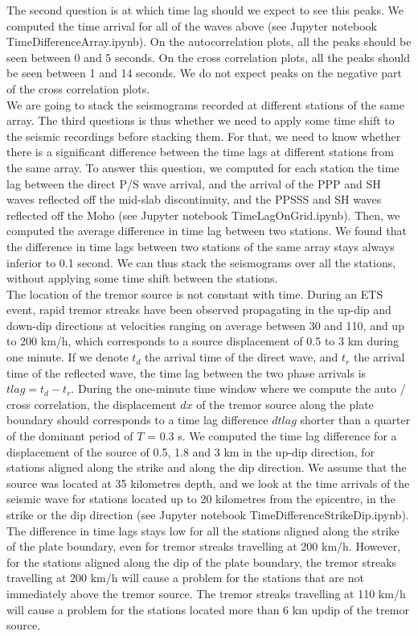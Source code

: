 \documentclass[workdone.tex]{subfiles}
\begin{document}
The second question is at which time lag should we expect to see this peaks. We computed the time arrival for all of the waves above (see Jupyter notebook TimeDifferenceArray.ipynb). On the autocorrelation plots, all the peaks should be seen between 0 and 5 seconds. On the cross correlation plots, all the peaks should be seen between 1 and 14 seconds. We do not expect peaks on the negative part of the cross correlation plots. \\

We are going to stack the seismograms recorded at different stations of the same array. The third questions is thus whether we need to apply some time shift to the seismic recordings before stacking them. For that, we need to know whether there is a significant difference between the time lags at different stations from the same array. To answer this question, we computed for each station the time lag between the direct P/S wave arrival, and the arrival of the PPP and SH waves reflected off the mid-slab discontinuity, and the PPSSS and SH waves reflected off the Moho (see Jupyter notebook TimeLagOnGrid.ipynb). Then, we computed the average difference in time lag between two stations. We found that the difference in time lags between two stations of the same array stays always inferior to 0.1 second. We can thus stack the seismograms over all the stations, without applying some time shift between the stations. \\

The location of the tremor source is not constant with time. During an ETS event, rapid tremor streaks have been observed propagating in the up-dip and down-dip directions at velocities ranging on average between 30 and 110, and up to 200 km/h, which corresponds to a source displacement of 0.5 to 3 km during one minute. If we denote $t_d$ the arrival time of the direct wave, and $t_r$ the arrival time of the reflected wave, the time lag between the two phase arrivals is $tlag = t_d - t_r$. During the one-minute time window where we compute the auto / cross correlation, the displacement $dx$ of the tremor source along the plate boundary should corresponds to a time lag difference $dtlag$ shorter than a quarter of the dominant period of $T$ = 0.3 s. We computed the time lag difference for a displacement of the source of 0.5, 1.8 and 3 km in the up-dip direction, for stations aligned along the strike and along the dip direction. We assume that the source was located at 35 kilometres depth, and we look at the time arrivals of the seismic wave for stations located up to 20 kilometres from the epicentre, in the strike or the dip direction (see Jupyter notebook TimeDifferenceStrikeDip.ipynb). The difference in time lags stays low for all the stations aligned along the strike of the plate boundary, even for tremor streaks travelling at 200 km/h. However, for the stations aligned along the dip of the plate boundary, the tremor streaks travelling at 200 km/h will cause a problem for the stations that are not immediately above the tremor source. The tremor streaks travelling at 110 km/h will cause a problem for the stations located more than 6 km updip of the tremor source.
\end{document}
